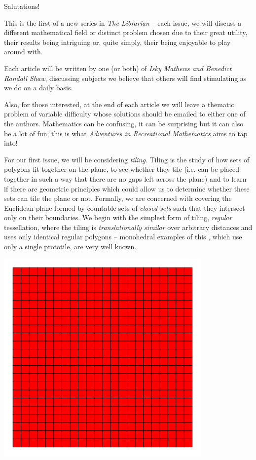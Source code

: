 \documentclass[1opt,a4paper]{article}
\newcounter{count}
\begin{document}
\begin{multicols}{2}
Salutations!

This is the first of a new series in \emph{The Librarian }-- each issue,
we will discuss a different mathematical field or distinct problem
chosen due to their great utility, their results being intriguing or,
quite simply, their being enjoyable to play around with.

Each article will be written by one (or both) of \emph{Isky Mathews
and Benedict Randall Shaw}, discussing subjects we believe that others
will find stimulating as we do on a daily basis.

Also, for those interested, at the end of each article we will leave a
thematic problem of variable difficulty whose solutions should be
emailed to either one of the authors. Mathematics can be confusing, it
can be surprising but it can also be a lot of fun; this is what
\emph{Adventures in Recreational Mathematics} aims to tap into!

For our first issue, we will be considering \emph{tiling}. Tiling is the
study of how sets of polygons fit together on the plane, to see
whether they tile (i.e. can be placed together in such a way that
there are no gaps left across the plane) and to learn if there are
geometric principles which could allow us to determine whether these
sets can tile the plane or not. Formally, we are concerned with covering
the Euclidean plane formed by countable sets of \emph{closed sets} such that they intersect only on their boundaries. We begin with the
simplest form of tiling, \emph{regular} tessellation, where the tiling
is \emph{translationally similar} over arbitrary distances and uses only
identical regular polygons -- monohedral examples of this , which use only a single prototile, are very well known.

\includegraphics[width=\linewidth]{image_0.png}


\end{multicols}
\end{document}
